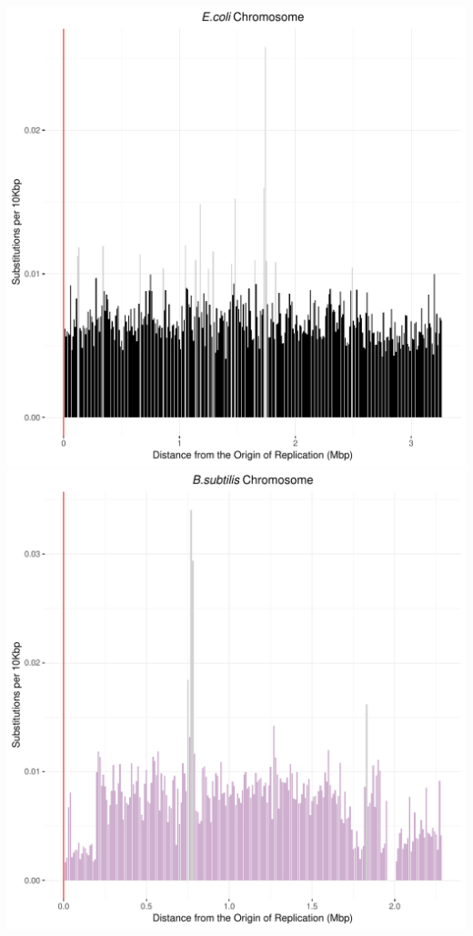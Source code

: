 \documentclass[12pt]{article}
\begin{document}
\includegraphics[width=\textwidth]{ecoli_weighted_subs_bidirectionality_colour_6Nov19.pdf}
\includegraphics[width=\textwidth]{bass_weighted_subs_bidirectionality_colour_2Nov19.pdf}
\end{document}
